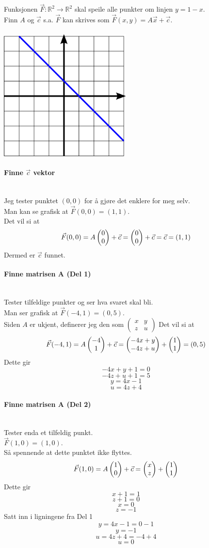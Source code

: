 Funksjonen $\vec{F}: \mathbb{R}^2 \to \mathbb{R}^2$
skal speile alle punkter om linjen $y = 1 - x$.\\
Finn $A$ og $\vec{c}$ s.a. $\vec{F}$ kan skrives som
$\vec{F}(x,y) = A\vec{x} + \vec{c}$.\\\\
\includegraphics[width=0.5\textwidth]{./img/mat1110-oblig1-oppg1.png}

\paragraph{Finne $\vec{c}$ vektor} \mbox{} \\
Jeg tester punktet $(0,0)$ for å gjøre det enklere for meg selv.\\
Man kan se grafisk at
$\vec{F}(0,0) = (1,1)$.\\
Det vil si at
$$\vec{F}(0,0) = A\colvec{0}{0}+\vec{c}
= \colvec{0}{0}+\vec{c} = \vec{c} = (1,1)$$
Dermed er $\vec{c}$ funnet.

\paragraph{Finne matrisen A (Del 1)} \mbox{} \\
Tester tilfeldige punkter og ser hva svaret skal bli.\\
Man ser grafisk at
$\vec{F}(-4,1) = (0,5)$.\\
Siden $A$ er ukjent, definerer jeg den som
$\left( \begin{matrix}
  x & y \\
  z & u
\end{matrix} \right)$
Det vil si at
$$\vec{F}(-4,1) = A\colvec{-4}{1}+\vec{c}
= \colvec{-4x+y}{-4z+u} + \colvec{1}{1} = (0,5)$$
Dette gir
$$-4x + y + 1 = 0 $$
$$-4z + u + 1 = 5$$
$$y = 4x - 1$$
$$u = 4z + 4$$

\paragraph{Finne matrisen A (Del 2)} \mbox{} \\
Tester enda et tilfeldig punkt.\\
$\vec{F}(1,0) = (1,0)$.\\
Så spennende at dette punktet ikke flyttes.\\
$$\vec{F}(1,0) = A\colvec{1}{0} + \vec{c}
= \colvec{x}{z} + \colvec{1}{1}$$
Dette gir
$$x+1=1$$
$$z+1=0$$
$$x = 0$$
$$z = -1$$
Satt inn i ligningene fra Del 1
$$y = 4x-1 = 0-1$$
$$y = -1$$
$$u = 4z+4 = -4+4$$
$$u = 0$$

